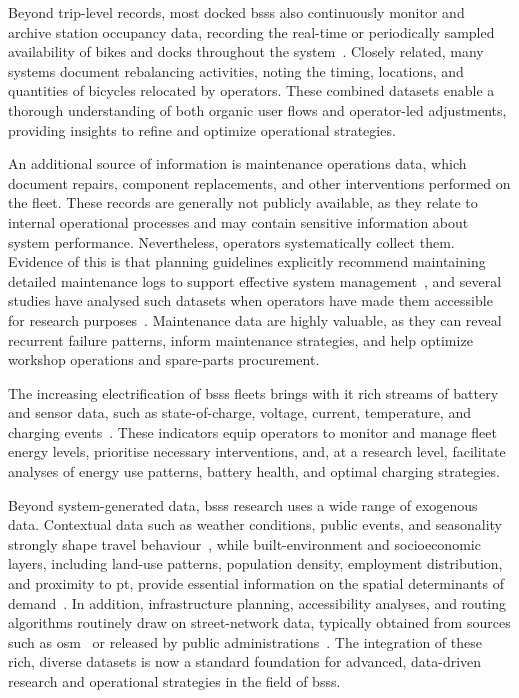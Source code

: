 Beyond trip-level records, most docked \acp{bss} also continuously monitor and archive station occupancy data, recording the real-time or periodically sampled availability of bikes and docks throughout the system~\cite{FaghihImani2014, CortezOrdonez2024}. Closely related, many systems document rebalancing activities, noting the timing, locations, and quantities of bicycles relocated by operators. These combined datasets enable a thorough understanding of both organic user flows and operator-led adjustments, providing insights to refine and optimize operational strategies.

An additional source of information is maintenance operations data, which document repairs, component replacements, and other interventions performed on the fleet. These records are generally not publicly available, as they relate to internal operational processes and may contain sensitive information about system performance. Nevertheless, operators systematically collect them. Evidence of this is that planning guidelines explicitly recommend maintaining detailed maintenance logs to support effective system management~\cite{Yanocha2018}, and several studies have analysed such datasets when operators have made them accessible for research purposes~\cite{deBrito2022, Gregoire2018}. Maintenance data are highly valuable, as they can reveal recurrent failure patterns, inform maintenance strategies, and help optimize workshop operations and spare-parts procurement.

The increasing electrification of \acp{bss} fleets brings with it rich streams of battery and sensor data, such as state-of-charge, voltage, current, temperature, and charging events~\cite{Waldner2025}. These indicators equip operators to monitor and manage fleet energy levels, prioritise necessary interventions, and, at a research level, facilitate analyses of energy use patterns, battery health, and optimal charging strategies.

Beyond system-generated data, \acp{bss} research uses a wide range of exogenous data. Contextual data such as weather conditions, public events, and seasonality strongly shape travel behaviour~\cite{Bean2021, Julio2022, Wang2021, Park2022}, while built-environment and socioeconomic layers, including land-use patterns, population density, employment distribution, and proximity to \ac{pt}, provide essential information on the spatial determinants of demand~\cite{FaghihImani2014, FaghihImani2016, MateoBabiano2016, FaghihImani2017, Sun2018, FaghihImani2017Empirical}. In addition, infrastructure planning, accessibility analyses, and routing algorithms routinely draw on street-network data, typically obtained from sources such as \ac{osm}~\cite{Li2020, Zochowska2021} or released by public administrations~\cite{GarciaPalomares2012}. The integration of these rich, diverse datasets is now a standard foundation for advanced, data-driven research and operational strategies in the field of \acp{bss}.


